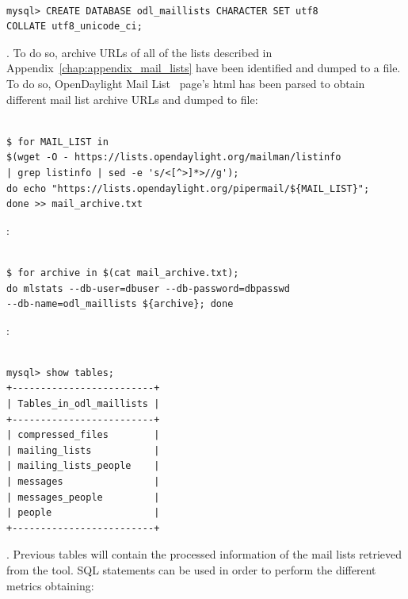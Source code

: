 \documentclass[a4paper, 12pt]{book}
\begin{document}
\begin{verbatim}

mysql> CREATE DATABASE odl_maillists CHARACTER SET utf8
COLLATE utf8_unicode_ci;

\end{verbatim}

. To do so, archive URLs of all of the lists described in Appendix~\ref{chap:appendix_mail_lists} have been identified and dumped to a file. To do so, OpenDaylight Mail List~\cite{OpenDaylightMailLists} page's html has been parsed to obtain different mail list archive URLs and dumped to file:

\begin{verbatim}

$ for MAIL_LIST in
$(wget -O - https://lists.opendaylight.org/mailman/listinfo
| grep listinfo | sed -e 's/<[^>]*>//g');
do echo "https://lists.opendaylight.org/pipermail/${MAIL_LIST}";
done >> mail_archive.txt

\end{verbatim}

:

\begin{verbatim}

$ for archive in $(cat mail_archive.txt);
do mlstats --db-user=dbuser --db-password=dbpasswd
--db-name=odl_maillists ${archive}; done

\end{verbatim}
:

\begin{verbatim}

mysql> show tables;
+-------------------------+
| Tables_in_odl_maillists |
+-------------------------+
| compressed_files        |
| mailing_lists           |
| mailing_lists_people    |
| messages                |
| messages_people         |
| people                  |
+-------------------------+

\end{verbatim}
. Previous tables will contain the processed information of the mail lists retrieved from the tool. SQL statements can be used in order to perform the different metrics obtaining:
\end{document}

